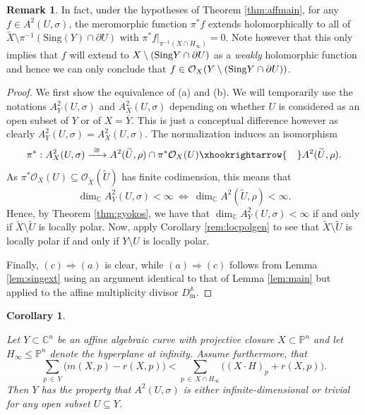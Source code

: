 \documentclass[11pt]{amsart}
\newtheorem{corollary}[theorem]{Corollary}
\theoremstyle{definition}
\newtheorem{remark}[theorem]{Remark}
\newcommand{\bC}{{\mathbb C}}
\begin{document}
\begin{remark}
    In fact, under the hypotheses of Theorem \ref{thm:affmain}, for any $f \in A^2(U,\sigma)$, the meromorphic function $\pi^*f$ extends holomorphically to all of $\widetilde{X} \setminus \pi^{-1}(\text{Sing}(Y) \cap \partial U)$ with $\pi^*f \big|_{\pi^{-1}(X\cap H_\infty)} = 0$. Note however that this only implies that $f$ will extend to $X \setminus ({\rm Sing}Y\cap \partial U)$ as a \emph{weakly} holomorphic function and hence we can only conclude that $f \in \mathcal{O}_X(Y \setminus ({\rm Sing}Y\cap \partial U))$.
\end{remark}

\begin{proof}
    We first show the equivalence of (a) and (b). We will temporarily use the notations $A^2_Y(U,\sigma)$ and $A^2_X(U,\sigma)$ depending on whether $U$ is considered as an open subset of $Y$ or of $X=\overline{Y}$. This is just a conceptual difference however as clearly $A^2_Y(U,\sigma) = A^2_X(U,\sigma)$. The normalization induces an isomorphism
    $$\pi^* : A^2_X(U,\sigma) \xrightarrow{\ \cong \ } A^2(\widetilde{U},\rho) \cap \pi^*\mathcal{O}_X(U) \xhookrightarrow{ \ \ \ } A^2(\widetilde{U},\rho).$$
    As $\pi^*\mathcal{O}_X(U) \subseteq \mathcal{O}_{\widetilde{X}}(\widetilde{U})$ has finite codimension, this means that
    $$\dim_\bC A^2_Y(U,\sigma) < \infty \ \Longleftrightarrow \ \dim_\bC A^2(\widetilde{U},\rho) < \infty.$$
    Hence, by Theorem \ref{thm:gyokos}, we have that $\dim_\bC A^2_Y(U,\sigma) < \infty$ if and only if $\widetilde{X} \setminus \widetilde{U}$ is locally polar. Now, apply Corollary \ref{rem:locpolgen} to see that $\widetilde{X} \setminus \widetilde{U}$ is locally polar if and only if $Y \setminus U$ is locally polar.

    Finally, $(c) \Rightarrow (a)$ is clear, while $(a) \Rightarrow (c)$ follows from Lemma \ref{lem:singext} using an argument identical to that of Lemma \ref{lem:main} but applied to the affine multiplicity divisor $D_{\text{m}}^{\mathbb{A}}$.
\end{proof}


\begin{corollary}\label{cor:szingWD}

    Let $Y\subset \bC^n$ be an affine algebraic curve with projective closure $X\subset \mathbb{P}^n$ and let $H_\infty \leq \mathbb{P}^n $ denote the hyperplane at infinity. Assume furthermore, that
    $$\sum_{p\,\in\, Y}\big(m(X,p)-r(X,p)\big)<\sum_{p \,\in\, X \cap H_\infty}\big((X\cdot H)_p + r(X,p) \big).$$
    Then $Y$ has the property that $A^2(U,\sigma)$ is either infinite-dimensional or trivial for any open subset $U \subseteq Y$.
\end{corollary}
\end{document}
